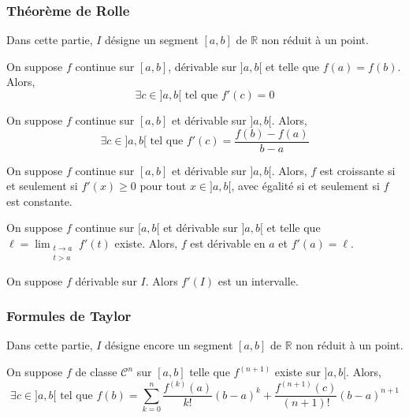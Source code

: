   \subsubsection{Théorème de Rolle}

  Dans cette partie, $I$ désigne un segment $[a,b]$ de $\mathbb{R}$ non réduit à un point.

  \begin{theorem}[Rolle]
    On suppose $f$ continue sur $[a,b]$, dérivable sur $]a,b[$ et telle que $f(a) = f(b)$. Alors,
    \[ \exists c \in ]a,b[ \text{ tel que } f'(c) = 0 \]
  \end{theorem}

  \begin{theorem}
    On suppose $f$ continue sur $[a,b]$ et dérivable sur $]a,b[$. Alors,
    \[ \exists c \in ]a,b[ \text{ tel que } f'(c) = \frac{f(b) - f(a)}{b-a} \]
  \end{theorem}

  \begin{corollary}
    On suppose $f$ continue sur $[a,b]$ et dérivable sur $]a,b[$. Alors, $f$ est croissante si et seulement si $f'(x) \geq 0$ pour tout $x \in ]a,b[$, avec égalité si et seulement si $f$ est constante.
  \end{corollary}

  \begin{corollary}
    On suppose $f$ continue sur $[a,b[$ et dérivable sur $]a,b[$ et telle que $\ell = \lim_{\substack{t \rightarrow a \\ t > a}} f'(t)$ existe. Alors, $f$ est dérivable en $a$ et $f'(a) = \ell$.
  \end{corollary}


  \begin{theorem}[Darboux]
    On suppose $f$ dérivable sur $I$. Alors $f'(I)$ est un intervalle.
  \end{theorem}

  \subsubsection{Formules de Taylor}


  Dans cette partie, $I$ désigne encore un segment $[a,b]$ de $\mathbb{R}$ non réduit à un point.

  \begin{theorem}
    On suppose $f$ de classe $\mathcal{C}^n$ sur $[a,b]$ telle que $f^{(n+1)}$ existe sur $]a,b[$. Alors,
    \[ \exists c \in ]a,b[ \text{ tel que } f(b) = \sum_{k=0}^{n} \frac{f^{(k)} (a)}{k!} (b-a)^k + \frac{f^{(n+1)}(c)}{(n+1)!} (b-a)^{n+1} \]
  \end{theorem}

